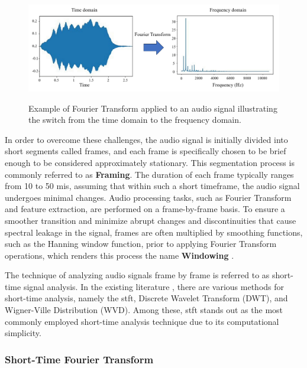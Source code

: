 \begin{figure}[htbp]
    \raggedright
        \caption{Example of Fourier Transform applied to an audio signal illustrating the switch from the time domain to the frequency domain.}
        \includegraphics[width=1.0\textwidth]{resources/images/030-theoretical_framework/Framework_digital_audio_fourier_transform.png}
        \label{fig:frmwk_digital_audio_fourier_transform}
\end{figure}

In order to overcome these challenges, the audio signal is initially divided into short segments called frames, and each frame is specifically chosen to be brief enough to be considered approximately stationary. This segmentation process is commonly referred to as \textbf{Framing}. The duration of each frame typically ranges from 10 to 50 \gls{mi}\gls{s}, assuming that within such a short timeframe, the audio signal undergoes minimal changes. Audio processing tasks, such as Fourier Transform and feature extraction, are performed on a frame-by-frame basis. To ensure a smoother transition and minimize abrupt changes and discontinuities that cause spectral leakage in the signal, frames are often multiplied by smoothing functions, such as the Hanning window function, prior to applying Fourier Transform operations, which renders this process the name \textbf{Windowing} \cite{Abreha2014}.

The technique of analyzing audio signals frame by frame is referred to as short-time signal analysis. In the existing literature \cite{Debnath2014}, there are various methods for short-time analysis, namely the \gls{stft}, Discrete Wavelet Transform (DWT), and Wigner-Ville Distribution (WVD). Among these, \gls{stft} stands out as the most commonly employed short-time analysis technique due to its computational simplicity.


\subsubsection{Short-Time Fourier Transform}
\label{subsubsec:audio_fundamentals_fourier_transform}

